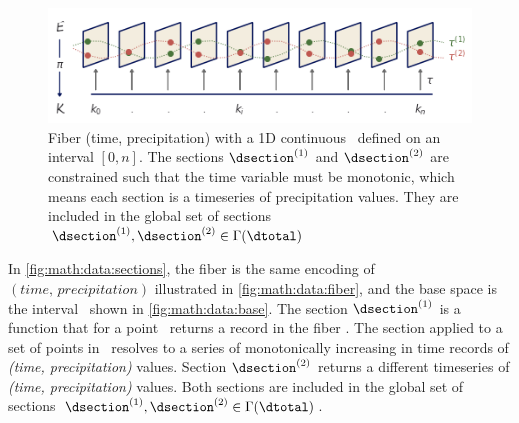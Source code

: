 \documentclass[../main.tex]{subfiles}
\begin{document}
\begin{figure}[H]
    \includegraphics[width=1\linewidth]{figures/math/fiberbundle.png}
    \caption{ Fiber (time, precipitation) with a 1D continuous \dbase\  defined on an interval $\left[0,n\right]$. The sections $\dsection^{(1)}$ and $\dsection^{(2)}$ are constrained such that the time variable must be monotonic, which means each section is a timeseries of precipitation values. They are included in the global set of sections  $\dsection^{(1)}, \dsection^{(2)} \in \Gamma(\dtotal)$}
    \label{fig:math:data:sections}
\end{figure}

In \autoref{fig:math:data:sections}, the fiber is the same encoding of $(time, \, precipitation)$ illustrated in \autoref{fig:math:data:fiber}, and the base space is the interval \dbase\ shown in \autoref{fig:math:data:base}. The section $\dsection^{(1)}$ is a function that for a point \dbasepoint\ returns a record in the fiber \dfiber. The section applied to a set of points in \dbase\ resolves to a series of monotonically increasing in time records of \textit{(time, precipitation)} values. Section $\dsection^{(2)}$ returns a different timeseries of \textit{(time, precipitation)} values. Both sections are included in the global set of sections $\dsection^{(1)}, \dsection^{(2)} \in \Gamma(\dtotal)$.
\end{document}
